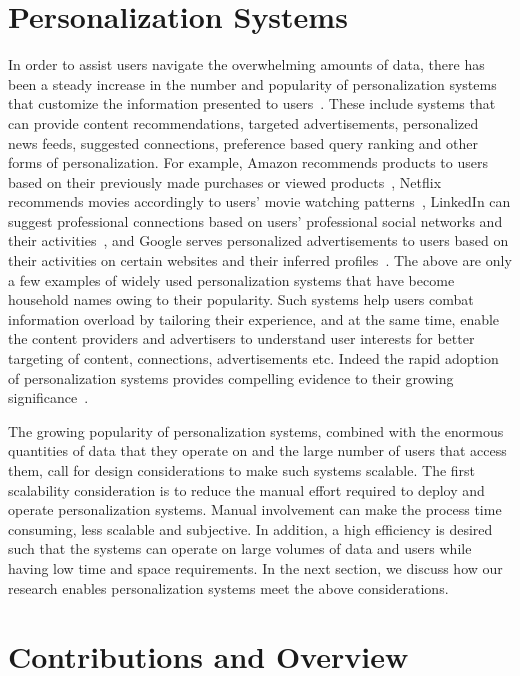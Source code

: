 \documentclass[12pt]{ucsddissertation}
\begin{document}
\section{Personalization Systems}
In order to assist users navigate the overwhelming amounts of data, there has been a steady increase in the number and popularity of personalization systems that customize the information presented to users~\cite{eirinaki2003web}. These include systems that can provide content recommendations, targeted advertisements, personalized news feeds, suggested connections, preference based query ranking and other forms of personalization. For example, Amazon recommends products to users based on their previously made purchases or viewed products~\cite{Amazon}, Netflix recommends movies accordingly to users' movie watching patterns~\cite{Netflix}, LinkedIn can suggest professional connections based on users' professional social networks and their activities~\cite{LinkedIn}, and Google serves personalized advertisements to users based on their activities on certain websites and their inferred profiles~\cite{Google,castelluccia2012betrayed,GoogleAdsense}. The above are only a few examples of widely used personalization systems that have become household names owing to their popularity. Such systems help users combat information overload by tailoring their experience, and at the same time, enable the content providers and advertisers to understand user interests for better targeting of content, connections, advertisements etc. Indeed the rapid adoption of personalization systems provides compelling evidence to their growing significance~\cite{castellano2009innovations}. 


The growing popularity of personalization systems, combined with the enormous quantities of data that they operate on and the large number of users that access them, call for design considerations to make such systems scalable. The first scalability consideration is to reduce the manual effort required to deploy and operate personalization systems. Manual involvement can make the process time consuming, less scalable and subjective. In addition, a high efficiency is desired such that the systems can operate on large volumes of data and users while having low time and space requirements. In the next section, we discuss how our research enables personalization systems meet the above considerations. 

\section{Contributions and Overview}
\end{document}
